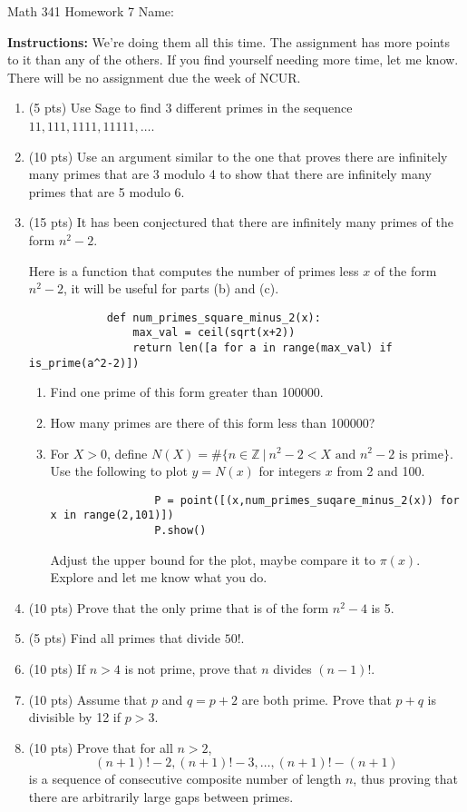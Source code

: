 \documentclass[12pt]{article}
\newcommand{\Z}{\mathbb{Z}}
\begin{document}
	Math 341 Homework 7
	\hfill
	Name: \underline{\hspace*{2in}}
	
	\textbf{Instructions:} We're doing them all this time. The assignment has more points to it than any of the others. If you find yourself needing more time, let me know. There will be no assignment due the week of NCUR.
\begin{enumerate}
	\item (5 pts) Use Sage to find 3 different primes in the sequence $11,111,1111,11111,\dots$.\vskip 2in
	\item (10 pts) Use an argument similar to the one that proves there are infinitely many primes that are 3 modulo 4 to show that there are infinitely many primes that are 5 modulo 6.
		\vfill
		\newpage
	\item (15 pts) It has been conjectured that there are infinitely many primes of the form $n^2-2$.

	Here is a function that computes the number of primes less $x$ of the form $n^2-2$, it will be useful for parts (b) and (c).
		\begin{verbatim}
			def num_primes_square_minus_2(x):
			    max_val = ceil(sqrt(x+2))
			    return len([a for a in range(max_val) if is_prime(a^2-2)]) 
		\end{verbatim}
		\begin{enumerate}
			\item Find one prime of this form greater than 100000.\vskip 2in
			\item How many primes are there of this form less than 100000?\vskip 2in
			\item For $X>0$, define $N(X)=\#\{n\in\Z\ |\ n^2-2 < X \text{ and } n^2-2 \text{ is prime}\}$. Use the following to plot $y=N(x)$ for integers $x$ from 2 and 100.
			\begin{verbatim}
				P = point([(x,num_primes_suqare_minus_2(x)) for x in range(2,101)])
				P.show()
			\end{verbatim}
				Adjust the upper bound for the plot, maybe compare it to $\pi(x)$. Explore and let me know what you do.
		\end{enumerate}
	\newpage
	\item (10 pts) Prove that the only prime that is of the form $n^2-4$ is 5.
	\vfill
	\item (5 pts) Find all primes that divide $50!$.
	\vskip 2in
	\item (10 pts) If $n>4$ is not prime, prove that $n$ divides $(n-1)!$.
	\vfill
	\newpage
	\item (10 pts) Assume that $p$ and $q=p+2$ are both prime. Prove that $p+q$ is divisible by 12 if $p>3$.
	\vfill
	\item (10 pts) Prove that for all $n>2$,
		$$(n+1)!-2, (n+1)!-3,\dots,(n+1)!-(n+1)$$
		is a sequence of consecutive composite number of length $n$, thus proving that there are arbitrarily large gaps between primes. 
	\vfill
\end{enumerate}
\end{document}
